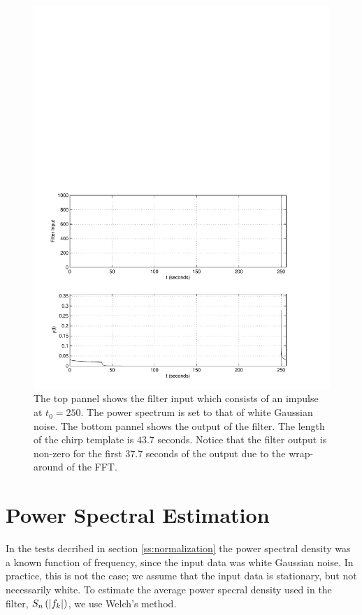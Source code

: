 \begin{figure}[htb]
\label{f:impuse_wraparound}
\begin{center}
\includegraphics[width=\linewidth]{figures/findchirp/impulse_wraparound}
\end{center}
\caption{%
The top pannel shows the filter input which consists of an impulse at $t_0 = 250$.
The power spectrum is set to that of white Gaussian noise. The bottom pannel
shows the output of the filter. The length of the chirp template is $43.7$
seconds. Notice that the filter output is non-zero for the first $37.7$
seconds of the output due to the wrap-around of the FFT.
}
\end{figure}

\section{Power Spectral Estimation}
\label{ss:psd}

In the tests decribed in section \ref{ss:normalization} the power spectral
density was a known function of frequency, since the input data was white
Gaussian noise. In practice, this is not the case; we assume that the input
data is stationary, but not necessarily white. To estimate the average power
specral density used in the filter, $S_n\left(\left|f_{k}\right|\right)$, we use Welch's method\cite{fftbook}. 

